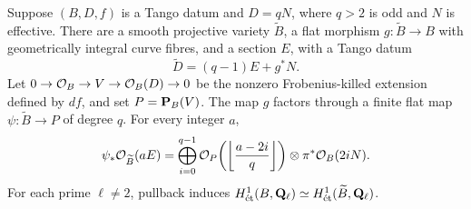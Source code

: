 \begin{lemma}\label{lem:iteration}
Suppose $(B,D,f)$ is a Tango datum and $D=qN$, where $q>2$ is odd and $N$ is effective. There are a smooth projective variety $\widetilde B$, a flat morphism $g:\widetilde B\to B$ with geometrically integral curve fibres, and a section $E$, with a Tango datum
\[
 \widetilde D=(q-1)E+g^*N.
\]
Let $0\to\mathcal O_B\to V\to\mathcal O_B(D)\to0$ be the nonzero Frobenius-killed extension defined by $df$, and set $P=\mathbf P_B(V)$. The map $g$ factors through a finite flat map $\psi:\widetilde B\to P$ of degree $q$. For every integer $a$,
\begin{equation}\label{eq:iteration}
 \psi_*\mathcal O_{\widetilde B}(aE)=
 \bigoplus_{i=0}^{q-1}\mathcal O_P\!\left(\left\lfloor\frac{a-2i}{q}\right\rfloor\right)
             \otimes\pi^*\mathcal O_B(2iN).
\end{equation}
For each prime $\ell\ne2$, pullback induces
$H^1_{\mathrm{\acute et}}(B,\mathbf Q_\ell)\simeq H^1_{\mathrm{\acute et}}(\widetilde B,\mathbf Q_\ell)$.
\end{lemma}

